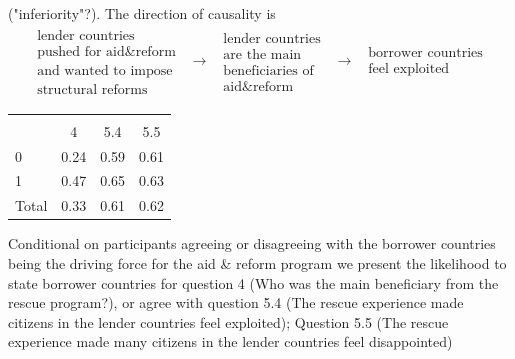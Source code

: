("inferiority"?). The direction of causality is%
\begin{equation*}
\begin{array}{ccccc}
\begin{array}{c}
\text{lender countries} \\ 
\text{pushed for aid\&reform} \\ 
\text{and wanted to impose} \\ 
\text{structural reforms}%
\end{array}
& \rightarrow  & 
\begin{array}{c}
\text{lender countries} \\ 
\text{are the main} \\ 
\text{beneficiaries of} \\ 
\text{aid\&reform}%
\end{array}
& \rightarrow  & 
\begin{array}{c}
\text{borrower countries} \\ 
\text{feel exploited}%
\end{array}%
\end{array}%
\end{equation*}
\begin{table}
  \begin{center}
\begin{tabular}{l*{1}{ccc}}
\hline\hline
                    &\multicolumn{3}{c}{}                  \\
                    & 4& 5.4 &  5.5 \\
\hline
0                   &        0.24&        0.59&        0.61\\
1                   &        0.47&        0.65&        0.63\\
Total               &        0.33&        0.61&        0.62\\
\hline\hline
\end{tabular}
\end{center}
\begin{tablenotes}
\item \tiny Conditional on participants agreeing or disagreeing with the borrower countries being the driving force for the aid & reform program we present the likelihood to state borrower countries for question 4 (Who was the main beneficiary from the rescue program?), or agree with question 5.4 (The rescue experience made citizens in the lender countries feel exploited); Question 5.5 (The rescue experience made many citizens in the lender countries feel disappointed)
\end{tablenotes}
\end{table}

